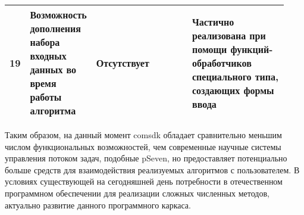 \begin{landscape}
\begin{longtable}{|p{0.03\linewidth}|p{0.2\linewidth}|p{0.35\linewidth}|p{0.35\linewidth}|}
        \hline
        19         & Возможность дополнения набора входных данных во время работы алгоритма                     & Отсутствует                                                                                                                                                                                                                                                                                                                                                                                                                                                                                                                                                                                                                                                       & Частично реализована при помощи функций-обработчиков специального типа, создающих формы ввода                                                                                                                                                                                     \\
        \hline
    \end{longtable}
\end{landscape}

Таким образом, на данный момент comsdk обладает сравнительно меньшим числом функциональных возможностей, чем современные научные системы управления потоком задач, подобные pSeven, но предоставляет потенциально больше средств для взаимодействия реализуемых алгоритмов с пользователем. В условиях существующей на сегодняшней день потребности в отечественном программном обеспечении для реализации сложных численных методов, актуально развитие данного программного каркаса.

